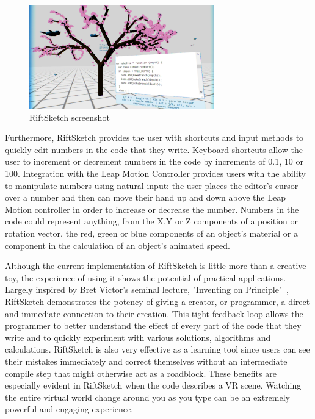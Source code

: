 \documentclass[conference]{IEEEtran}
\begin{document}
\begin{figure}[ht!]
\centering
\includegraphics[width=80mm]{figures/riftsketch/closer}
\caption{RiftSketch screenshot \label{riftsketch}}
\end{figure}

Furthermore, RiftSketch provides the user with shortcuts and input methods to quickly edit numbers in the code that they write. 
Keyboard shortcuts allow the user to increment or decrement numbers in the code by increments of 0.1, 10 or 100. 
Integration with the Leap Motion Controller provides users with the ability to manipulate numbers using natural input: the user places the editor's cursor over a number and then can move their hand up and down above the Leap Motion controller in order to increase or decrease the number. 
Numbers in the code could represent anything, from the X,Y or Z components of a position or rotation vector, the red, green or blue components of an object's material or a component in the calculation of an object's animated speed.

Although the current implementation of RiftSketch is little more than a creative toy, the experience of using it shows the potential of practical applications. 
Largely inspired by Bret Victor's seminal lecture, "Inventing on Principle"~\cite{Victor:InventingOnPrincipleVideo}\cite{Victor:InventingOnPrincipleTranscript}, RiftSketch demonstrates the potency of giving a creator, or programmer, a direct and immediate connection to their creation. 
This tight feedback loop allows the programmer to better understand the effect of every part of the code that they write and to quickly experiment with various solutions, algorithms and calculations. 
RiftSketch is also very effective as a learning tool since users can see their mistakes immediately and correct themselves without an intermediate compile step that might otherwise act as a roadblock.  
These benefits are especially evident in RiftSketch when the code describes a VR scene. 
Watching the entire virtual world change around you as you type can be an extremely powerful and engaging experience.
\end{document}
